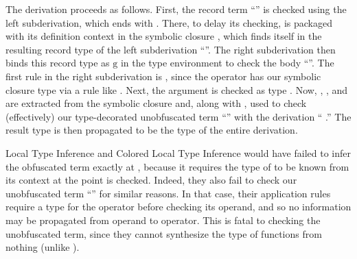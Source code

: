 The derivation proceeds as follows.
First, the record term 
``{}''
is checked using the left subderivation, which ends with \ltiSimpUAbs.
There, to delay its checking, {\colorbox{pink}{\ltiufun{\ltivar{}}{\ltiF{}}}}
is packaged with its definition context {\colorbox{pink}{\ltiEnv{}}}
in the symbolic closure {\colorbox{pink}{\ltiClosure{\ltiEnv{}}{\ltiufun{\ltivar{}}{\ltiF{}}}}},
which finds itself in the resulting record type of the left subderivation
``{}''.
The right subderivation then binds this record type as $\text{g}$ in the type environment
to check the body ``{}''.
The first rule in the right subderivation is \ltiSimpAppInfClosure,
since the operator {}
has our symbolic closure type
{\colorbox{pink}{\ltiClosure{\ltiEnv{}}{\ltiufun{\ltivar{}}{\ltiF{}}}}}
via a rule like \ltiISel.
Next, the argument \ltiE{} is checked as type {\colorbox{pink}{\ltiS{}}}.
Now, {\colorbox{pink}{\ltiEnv{}}}, {\colorbox{pink}{\ltivar{}}},
and {\colorbox{pink}{\ltiF{}}}
are extracted from the symbolic closure
and, along with {\colorbox{pink}{\ltiS{}}}, used to check (effectively)
our type-decorated unobfuscated term
``{}''
with the derivation
    ``\ltitSstkjudgementNoElabCombined{\ltiClosureCache{}}
                      {
                                    {
                                                  {{\colorbox{pink}{\ltiS{}}}}}}
                      {\colorbox{pink}{\ltiF{}}}
                      {\colorbox{pink}{\ltiT{}}}
                      {\ltiClosureCache{}}
                      {}.''
The result type {\colorbox{pink}{\ltiT{}}}
is then propagated to be the type of the entire derivation.

Local Type Inference and Colored Local Type Inference
would have failed to infer the obfuscated term exactly
at \ltiSimpUAbs, because it requires the type of \ltivar{}
to be known from its context at the point \ltiufun{\ltivar{}}{\ltiF{}}
is checked.
Indeed, they also fail to check our unobfuscated term ``{\ltiappParens{\ltiufun{\ltivar{}}{\ltiF{}}}{\ltiE{}}}''
for similar reasons.
In that case, their application rules require a type for the operator before checking its operand,
and so no information may be propagated from operand to operator.
This is fatal to checking the unobfuscated term, since they cannot synthesize the type of functions
from nothing (unlike \ltiSimpUAbs).


